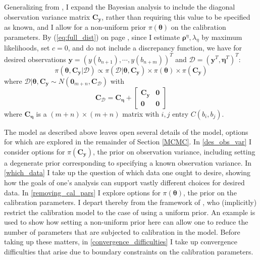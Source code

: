 \documentclass{article}
\begin{document}
Generalizing from \cite{Kennedy2006}, I expand the Bayesian analysis to include the diagonal observation variance matrix $\mathbf C_{\mathbf y}$, rather than requiring this value to be specified as known, and I allow for a non-uniform prior $\pi(\boldsymbol \theta)$ on the calibration parameters. By (\ref{eq:full_dist}) on page \pageref{eq:full_dist}, 
since I estimate $\boldsymbol \rho^\eta,\lambda_\eta$ by maximum likelihoods, set $c=0$, and do not include a discrepancy function, we have for desired observations $\mathbf y=(y (b_{n+1}),\cdots,y(b_{n+m}))^T$ and $\mathcal D=(\mathbf y^T, \boldsymbol\eta^T)^T$:
\begin{equation}\label{eq:the_model}
\pi(\boldsymbol \theta,\mathbf C_{\mathbf y}|\mathcal D) \propto \pi (\mathcal D|\boldsymbol \theta,\mathbf C_{\mathbf y})\times \pi(\boldsymbol \theta)\times \pi(\mathbf C_{\mathbf y})
\end{equation}
where $\mathcal D|\boldsymbol \theta,\mathbf C_{\mathbf y} \sim N(\boldsymbol 0_{m+n}, \mathbf C_{\mathcal D})$ with 
\begin{equation}\label{eq:the_covariance}
\mathbf C_{\mathcal D} = \mathbf C_{\boldsymbol\eta} + 
\begin{bmatrix}
\mathbf C_{\mathbf y} & \boldsymbol 0\\ 
\boldsymbol 0 & \boldsymbol 0
\end{bmatrix}
\end{equation}
where $\mathbf C_{\boldsymbol\eta}$ is a $(m+n)\times(m+n)$ matrix with $i,j$ entry $C(b_i,b_j)$.

The model as described above leaves open several details of the model, options for which are explored in the remainder of Section \ref{MCMC}. In \ref{des_obs_var} I consider options for $\pi(\mathbf C_{\mathbf y})$, the prior on observation variance, including setting a degenerate prior corresponding to specifying a known observation variance. In \ref{which_data} I take up the question of which data one ought to desire, showing how the goals of one's analysis can support vastly different choices for desired data. In \ref{removing_cal_pars} I explore options for $\pi(\boldsymbol \theta)$, the prior on the calibration parameters. I depart thereby from the framework of \cite{Kennedy2006}, who (implicitly) restrict the calibration model to the case of using a uniform prior. An example is used to show how setting a non-uniform prior here can allow one to reduce the number of parameters that are subjected to calibration in the model. Before taking up these matters, in \ref{convergence_difficulties} I take up convergence difficulties that arise due to boundary constraints on the calibration parameters.
\end{document}
